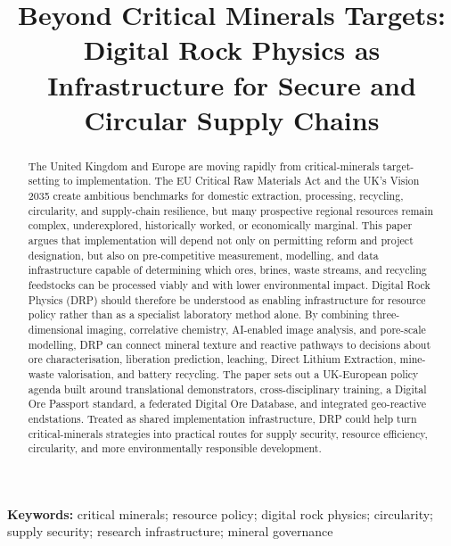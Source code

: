 \documentclass[12pt,a4paper]{article}
\title{\textbf{Beyond Critical Minerals Targets: Digital Rock Physics as Infrastructure for Secure and Circular Supply Chains}}
\author{}
\date{}
\begin{document}
\linenumbers

\maketitle

\begin{abstract}
The United Kingdom and Europe are moving rapidly from critical-minerals target-setting to implementation. The EU Critical Raw Materials Act and the UK's Vision 2035 create ambitious benchmarks for domestic extraction, processing, recycling, circularity, and supply-chain resilience, but many prospective regional resources remain complex, underexplored, historically worked, or economically marginal. This paper argues that implementation will depend not only on permitting reform and project designation, but also on pre-competitive measurement, modelling, and data infrastructure capable of determining which ores, brines, waste streams, and recycling feedstocks can be processed viably and with lower environmental impact. Digital Rock Physics (DRP) should therefore be understood as enabling infrastructure for resource policy rather than as a specialist laboratory method alone. By combining three-dimensional imaging, correlative chemistry, AI-enabled image analysis, and pore-scale modelling, DRP can connect mineral texture and reactive pathways to decisions about ore characterisation, liberation prediction, leaching, Direct Lithium Extraction, mine-waste valorisation, and battery recycling. The paper sets out a UK-European policy agenda built around translational demonstrators, cross-disciplinary training, a Digital Ore Passport standard, a federated Digital Ore Database, and integrated geo-reactive endstations. Treated as shared implementation infrastructure, DRP could help turn critical-minerals strategies into practical routes for supply security, resource efficiency, circularity, and more environmentally responsible development.
\end{abstract}

\noindent\textbf{Keywords:} critical minerals; resource policy; digital rock physics; circularity; supply security; research infrastructure; mineral governance
\end{document}
